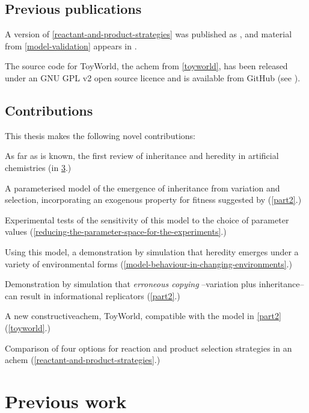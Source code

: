 \section{Previous publications}\label{previous-publications}

A version of \cref{reactant-and-product-strategies} was published as \textcite{Young2015}, and material from \cref{model-validation} appears in \textcite{Young2013}.

The source code for ToyWorld, the \gls{achem} from \cref{toyworld}, has been released under an GNU GPL v2 open source licence and is available from GitHub (see \cite{toyworld}).

\section{Contributions}\label{contributions}

This thesis makes the following novel contributions:

\begin{compactenum}
\item As far as is known, the first review of inheritance and heredity in artificial chemistries (in \cref{previous-work}.)
\item A parameterised model of the emergence of inheritance from variation and selection, incorporating an exogenous property for fitness suggested by \textcite{Bourrat2015} (\cref{part2}.)
\item Experimental tests of the sensitivity of this model to the choice of parameter values (\cref{reducing-the-parameter-space-for-the-experiments}.)
\item Using this model, a demonstration by simulation that heredity emerges under a variety of environmental forms (\cref{model-behaviour-in-changing-environments}.)
\item Demonstration by simulation that \emph{erroneous copying} \parencite{Zachar2010}--variation plus inheritance--can result in informational replicators (\cref{part2}.)
\item A new constructive\gls{achem}, ToyWorld, compatible with the model in \cref{part2}  (\cref{toyworld}.)
\item Comparison of four options for reaction and product selection strategies in an \gls{achem} (\cref{reactant-and-product-strategies}.)
\end{compactenum}

\chapter{Previous work}\label{previous-work}

